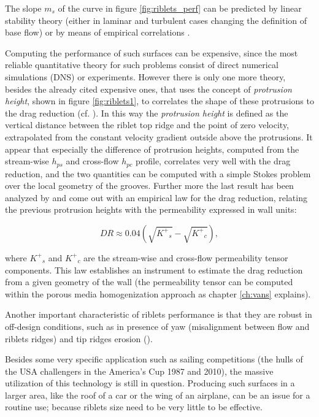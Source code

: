 The slope $m_s$ of the curve in figure \ref{fig:riblets_perf} can be predicted by linear stability theory (either in laminar and turbulent cases changing the definition of base flow) or by means of empirical correlations \citet{garcia2011hydrodynamic}.

Computing the performance of such surfaces can be expensive, since the most reliable quantitative theory for such problems consist of direct numerical simulations (DNS) or experiments.
However there is only one more theory, besides the already cited expensive ones, that uses the concept of \textit{protrusion height}, shown in figure \ref{fig:riblets1}, to correlates the shape of these protrusions to the drag reduction (cf. \citet{luchini1991resistance}).
In this way the \textit{protrusion height} is defined as the vertical distance between the riblet top ridge and the point of zero velocity, extrapolated from the constant velocity gradient outside above the protrusions.
It appear that especially the difference of protrusion heights, computed from the stream-wise $h_{ps}$ and cross-flow $h_{pc}$ profile, correlates very well with the drag reduction, and the two quantities can be computed with a simple Stokes problem over the local geometry of the grooves.
Further more the last result has been analyzed by \citet{segura2017permeable} and come out with an empirical law for the drag reduction, relating the previous protrusion heights with the permeability expressed in wall units:

\begin{equation}
DR \approx 0.04\left( \sqrt{{K^+}_s} - \sqrt{{K^+}_c} \right),
\label{eq:max_dr}
\end{equation}

where ${K^+}_s$ and ${K^+}_c$ are the stream-wise and cross-flow permeability tensor components.
This law establishes an instrument to estimate the drag reduction from a given geometry of the wall (the permeability tensor can be computed within the porous media homogenization approach as chapter \ref{ch:vans} explains).

Another important characteristic of riblets performance is that they are robust in off-design conditions, such as in presence of yaw (misalignment between flow and riblets ridges) and tip ridges erosion (\citet{garcia2011drag}).

Besides some very specific application such as sailing competitions (the hulls of the USA challengers in the America’s Cup 1987 and 2010), the massive utilization of this technology is still in question.
Producing such surfaces in a larger area, like the roof of a car or the wing of an airplane, can be an issue for a routine use; because riblets size need to be very little to be effective.


